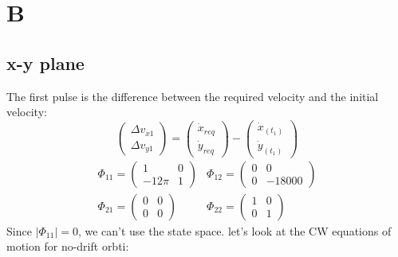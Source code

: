 \documentclass[11pt, a4paper]{article}
\begin{document}
\section{B}
\subsection{x-y plane}
The first pulse is the difference between the required velocity and the initial velocity:
\begin{equation}
    \begin{pmatrix}
        \Delta v_{x1} \\ \Delta v_{y1}
    \end{pmatrix} = \begin{pmatrix}
        \dot{x}_{req} \\ \dot{y}_{req}
    \end{pmatrix} - \begin{pmatrix}
        \dot{x}_{(t_1)} \\ \dot{y}_{(t_1)}
    \end{pmatrix}
\end{equation}
\begin{equation}
    \begin{array}{ll}
        \Phi_{11} = \begin{pmatrix}
            1 & 0 \\
            -12\pi & 1
        \end{pmatrix} & \Phi_{12} = \begin{pmatrix}
            0 & 0 \\
            0 & -18000
        \end{pmatrix} \\
        \Phi_{21} = \begin{pmatrix}
            0 & 0 \\
            0 & 0
        \end{pmatrix} &
        \Phi_{22} = \begin{pmatrix}
            1 & 0 \\
            0 & 1
        \end{pmatrix}
    \end{array}
\end{equation}
Since $\left|\Phi_{11}\right| = 0$, we can't use the state space. let's look at the CW equations of motion for no-drift orbti:
\end{document}
